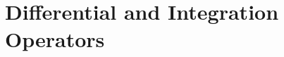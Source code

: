 \documentclass[12pt,letterpaper, openany]{book} %
\begin{document}
\chapter{Differential and Integration Operators}

%
%
%
%
%
%
%
%
%
%


%


 
\newenvironment{changemargin}[1]{%
\begin{list}{}{%
\setlength{\topsep}{#1}
\setlength{\listparindent}{\parindent}%
\setlength{\itemindent}{\parindent}%
\setlength{\parsep}{\parskip}%
}%
\item[]}{\end{list}}

\begin{changemargin}{0cm}
\printindex 
\end{changemargin}

 
\end{document}
